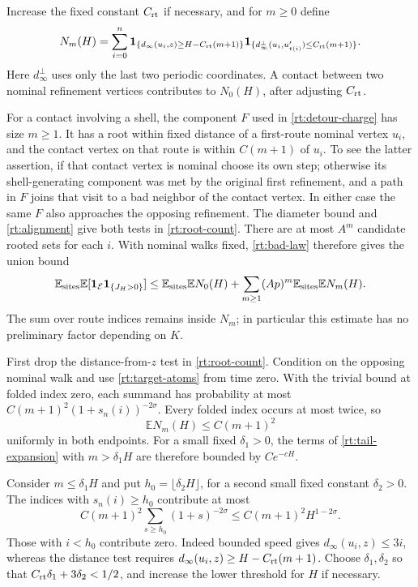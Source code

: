 Increase the fixed constant \(C_{\rm rt}\) if necessary, and for \(m\ge0\) define
\begin{equation}\label{rt:root-count}
 N_m(H)=\sum_{i=0}^n
  \mathbf1_{\{d_\infty(u_i,z)\ge H-C_{\rm rt}(m+1)\}}
  \mathbf1_{\{d_\infty^\perp(u_i,u'_{t(i)})\le C_{\rm rt}(m+1)\}}.
\end{equation}
Here \(d_\infty^\perp\) uses only the last two periodic coordinates.
A contact between two nominal refinement vertices contributes to
\(N_0(H)\), after adjusting \(C_{\rm rt}\).

For a contact involving a shell, the component \(F\) used in
\eqref{rt:detour-charge} has size \(m\ge1\).  It has a root within
fixed distance of a first-route nominal vertex \(u_i\), and the
contact vertex on that route is within \(C(m+1)\) of \(u_i\).
To see the latter assertion, if that contact vertex is nominal choose
its own step; otherwise its shell-generating component was met by the
original first refinement, and a path in \(F\) joins that visit to a
bad neighbor of the contact vertex.  In either case the same \(F\)
also approaches the opposing refinement.  The diameter bound and
\eqref{rt:alignment} give both tests in \eqref{rt:root-count}.
There are at most \(A^m\) candidate rooted sets for each \(i\).
With nominal walks fixed, \eqref{rt:bad-law} therefore gives the
union bound
\begin{equation}\label{rt:tail-expansion}
 \mathbb E_{\rm sites}\mathbb E
       [\mathbf1_{\mathcal E}\mathbf1_{\{J_H>0\}}]
 \le \mathbb E_{\rm sites}\mathbb E N_0(H)
       +\sum_{m\ge1}(Ap)^m
                    \mathbb E_{\rm sites}\mathbb E N_m(H).
\end{equation}
The sum over route indices remains inside \(N_m\); in particular
this estimate has no preliminary factor depending on \(K\).

First drop the distance-from-\(z\) test in \eqref{rt:root-count}.
Condition on the opposing nominal walk and use
\eqref{rt:target-atoms} from time zero.  With the trivial bound at
folded index zero, each summand has probability at most
\(C(m+1)^2(1+s_n(i))^{-2\sigma}\).  Every folded index occurs at
most twice, so
\begin{equation}\label{rt:root-global}
 \mathbb E N_m(H)\le C(m+1)^2
\end{equation}
uniformly in both endpoints.  For a small fixed \(\delta_1>0\),
the terms of \eqref{rt:tail-expansion} with \(m>\delta_1H\) are
therefore bounded by \(Ce^{-cH}\).

Consider \(m\le\delta_1H\) and put
\(h_0=\lfloor\delta_2H\rfloor\), for a second small fixed constant
\(\delta_2>0\).  The indices with \(s_n(i)\ge h_0\) contribute at
most
\begin{equation}\label{rt:bulk-tail}
 C(m+1)^2\sum_{s\ge h_0}(1+s)^{-2\sigma}
 \le C(m+1)^2H^{1-2\sigma}.
\end{equation}
Those with \(i<h_0\) contribute zero.  Indeed bounded speed gives
\(d_\infty(u_i,z)\le3i\), whereas the distance test requires
\(d_\infty(u_i,z)\ge H-C_{\rm rt}(m+1)\).  Choose \(\delta_1,\delta_2\)
so that \(C_{\rm rt}\delta_1+3\delta_2<1/2\), and increase the lower
threshold for \(H\) if necessary.


